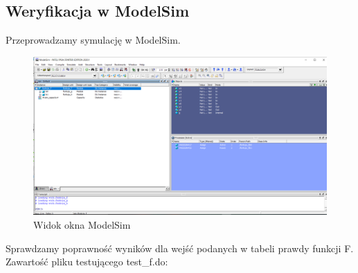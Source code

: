 \documentclass[]{article}
\begin{document}
\subsection{Weryfikacja w ModelSim}
\par Przeprowadzamy symulację w ModelSim.
\begin{figure}[H]
	\centering
	\includegraphics[width=1.25\textwidth]{modelsim1.png}
	\caption{Widok okna ModelSim}
\end{figure}
Sprawdzamy poprawność wyników dla wejść podanych w tabeli prawdy funkcji F. 
\newpage
Zawartość pliku testującego test\_f.do:
\end{document}
